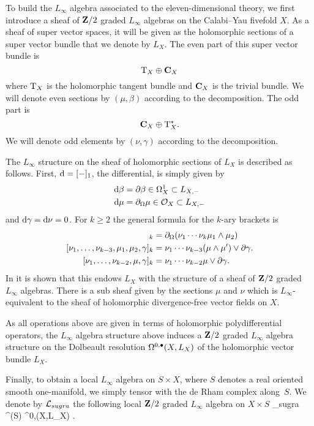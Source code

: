 \documentclass[11pt]{amsart}%
\begin{document}
To build the $L_\infty$ algebra associated to the eleven-dimensional theory, we first introduce a sheaf of $\mathbf{Z}/2$ graded $L_\infty$ algebras on the Calabi--Yau fivefold $X$.
As a sheaf of super vector spaces, it will be given as the holomorphic sections of a super vector bundle that we denote by $L_X$. 
The even part of this super vector bundle is
\[
{\rm T}_X \oplus \mathbf{C}_X 
\]
where ${\rm T}_X$ is the holomorphic tangent bundle and $\mathbf{C}_X$ is the trivial bundle.
We will denote even sections by $(\mu, \beta)$ according to the decomposition. 
The odd part is 
\[
\mathbf{C}_X \oplus {\rm T}^*_X .
\]
We will denote odd elements by $(\nu, \gamma)$ according to the decomposition. 

The $L_\infty$ structure on the sheaf of holomorphic sections of $L_X$ is described as follows. 
First, ${\rm d} = [-]_1$, the differential, is simply given by 
\begin{align*}
{\rm d} \beta & = \partial \beta \in \Omega^1_X \subset L_{X,-} \\
{\rm d} \mu & = \partial_{\Omega} \mu \in \mathcal O_X \subset L_{X, -}
\end{align*}
and ${\rm d} \gamma = {\rm d} \nu = 0$. 
For $k \geq 2$ the general formula for the $k$-ary brackets is 
\begin{align*}
[\nu_1, \ldots, \nu_{k-2}, \mu_1,\mu_2]_{k} & = \div(\nu_1 \cdots \nu_k \mu_1 \wedge \mu_2) \\
[\nu_1,\ldots, \nu_{k-3}, \mu_1,\mu_2,\gamma]_k & = \nu_1 \cdots \nu_{k-3} (\mu \wedge \mu') \vee \del \gamma .\\
[\nu_1,\ldots,\nu_{k-2}, \mu, \gamma]_k & = \nu_1 \cdots \nu_{k-2} \mu \vee \del \gamma .
\end{align*}
In \cite{RSW} it is shown that this endows $L_{X}$ with the structure of a sheaf of $\mathbf{Z}/2$ graded $L_\infty$ algebras.
There is a sub sheaf given by the sections $\mu$ and $\nu$ which is $L_\infty$-equivalent to the sheaf of holomorphic divergence-free vector fields on $X$. 

As all operations above are given in terms of holomorphic polydifferential operators, the $L_\infty$ algebra structure above induces a $\mathbf{Z}/2$ graded $L_\infty$ algebra structure on the Dolbeault resolution $\Omega^{0,\bullet}(X,L_X)$ of the holomorphic vector bundle $L_X$.

Finally, to obtain a local $L_\infty$ algebra on $S \times X$, where $S$ denotes a real oriented smooth one-manifold, we simply tensor with the de Rham complex along~$S$.
We denote by $\mathcal L_{sugra}$ the following local $\mathbf{Z}/2$ graded $L_\infty$ algebra on $X \times S$
\beqn
\cL_{sugra}  \Omega^\bu(S) \hotimes \Omega^{0,\bu}(X,L_X) .
\eeqn
\end{document}
